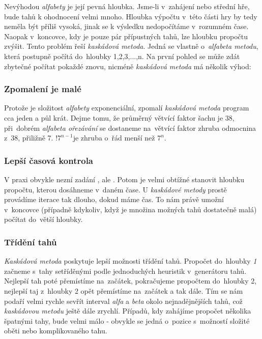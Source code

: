 \documentclass[11pt, titlepage]{article}
\begin{document}
Nevýhodou {\it alfabety} je její pevná hloubka. Jsme-li v~zahájení nebo střední hře, bude tahů k ohodnocení velmi mnoho. Hloubka výpočtu v~této části hry by tedy neměla být příliš vysoká, jinak se k výsledku nedopočítáme v~rozumném čase. Naopak v~koncovce, kdy je pouze pár přípustných tahů, lze hloubku propočtu zvýšit.
Tento problém řeší {\it kaskádová metoda}. Jedná se vlastně o~{\it alfabeta metodu}, která postupně počítá do~hloubky 1,2,3,...,n. Na první pohled se může zdát zbytečné počítat pokaždé znovu, nicméně {\it kaskádová metoda} má několik výhod:

\subsubsection{Zpomalení je malé}

Protože je složitost {\it alfabety} exponenciální, zpomalí {\it kaskádová metoda} program cca jeden a půl krát. Dejme tomu, že průměrný větvící faktor šachu je 38, při~dobrém {\it alfabeta ořezávání} se dostaneme na~větvící faktor zhruba odmocnina z~38, přiližně 7. \begin{math}!7^{n-1}\end{math}je zhruba o~řád menší než \begin{math}7^n\end{math}.

\subsubsection{Lepší časová kontrola}

V praxi obvykle nezní zadání , ale . Potom je velmi obtížné stanovit hloubku propočtu, kterou dosáhneme v~daném čase. U {\it kaskádové metody} prostě provádíme iterace tak dlouho, dokud máme čas. To nám právě umožní v~koncovce (případně kdykoliv, když je množina možných tahů dostatečně malá) počítat do~větší hloubky.

\subsubsection{Třídění tahů}

{\it Kaskádová metoda} poskytuje lepší možnosti třídění tahů. Propočet do~hloubky {\it 1} začneme s~tahy setříděnými podle jednoduchých heuristik v~generátoru tahů. Nejlepší tah poté přemístíme na~začátek, pokračujeme propočtem do~hloubky 2, nejlepší taj z~hloubky 2 opět přemístíme na~začátek a tak dále. Tím se nám podaří velmi rychle sevřít interval {\it alfa} a {\it beta} okolo nejnadějnějších tahů, což {\it kaskádovou metodu} ještě dále zrychlí. Případů, kdy zahájíme propočet několika špatnými tahy, bude velmi málo - obvykle se jedná o~pozice s~možností složité oběti nebo komplikovaného tahu.
\end{document}
